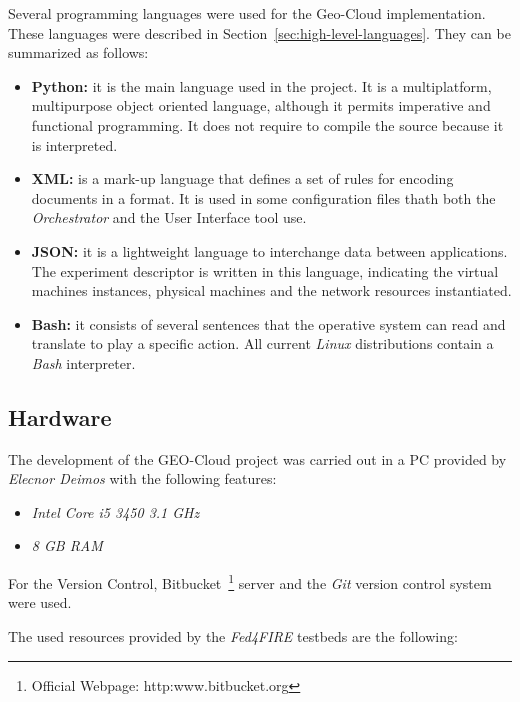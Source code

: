 Several programming languages were used for the Geo-Cloud
implementation. These languages were described in
Section~\ref{sec:high-level-languages}. They can be
summarized as follows:

\begin{itemize}
\item \textbf{Python:}  it is the main language used in the project. It is a
  multiplatform, multipurpose object oriented language, although it permits imperative and functional
programming. It does not require to compile the source because it is
interpreted.
 \item \textbf{\ac{XML}:} is a mark-up language that defines a set of rules for encoding
documents in a format. It is used in some configuration files thath both the
\emph{Orchestrator} and the User Interface tool use.

\item \textbf{\ac{JSON}:} it is a lightweight language to interchange data between
  applications. The \bonfire experiment descriptor is written in this
  language, indicating the virtual machines instances, physical machines and the
  network resources instantiated.

\item \textbf{Bash:} it consists of several sentences that the operative system can read and translate to play a specific action. All current
\emph{Linux} distributions contain a \emph{Bash} interpreter. 

\end{itemize}


\subsection{Hardware}

The development of the GEO-Cloud project was carried out in a PC provided by
\emph{Elecnor Deimos} with the following features:
\begin{itemize}
\item \emph{Intel Core i5 3450 3.1 GHz}
\item \emph{8 GB RAM}
\end{itemize}

For the Version Control, Bitbucket~\footnote{Official Webpage:
  http:www.bitbucket.org} server and the \emph{Git} version control system were used.

The used resources provided  by the \emph{Fed4FIRE} testbeds are the following:


